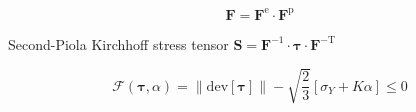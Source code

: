 
\begin{equation}
\bm{F} = \bm{F}^\mathrm{e} \cdot \bm{F}^\mathrm{p}
\end{equation}

Second-Piola Kirchhoff stress tensor $\bm{S} = \bm{F}^{-1}\cdot\bm{\tau}\cdot\bm{F}^\mathrm{-T}$

\begin{equation}
\mathscr{F} (\bm{\tau},\alpha) = \|\mathrm{dev}[\bm{\tau}]\| - \sqrt{\frac{2}{3}}\left[\sigma_Y + K\alpha\right] \le 0
\end{equation}
